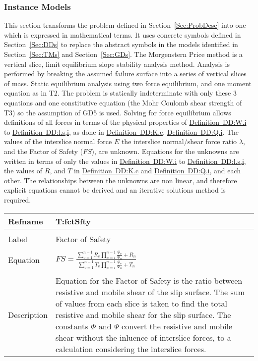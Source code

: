 \documentclass[12pt]{article}
\begin{document}
\subsubsection{Instance Models}
\label{Sec:IMs}
This section transforms the problem defined in Section~\ref{Sec:ProbDesc} into one which is expressed in mathematical terms. It uses concrete symbols defined in Section~\ref{Sec:DDs} to replace the abstract symbols in the models identified in Section~\ref{Sec:TMs} and Section~\ref{Sec:GDs}.
The Morgenstern Price method is a vertical slice, limit equilibrium slope stability analysis method. Analysis is performed by breaking the assumed failure surface into a series of vertical slices of mass. Static equilibrium analysis using two force equilibrium, and one moment equation as in T2. The problem is statically indeterminate with only these 3 equations and one constitutive equation (the Mohr Coulomb shear strength of T3) so the assumption of GD5 is used. Solving for force equilibrium allows definitions of all forces in terms of the physical properties of \hyperref[DD:W.i]{Definition~DD:W.i} to \hyperref[DD:l.s,i]{Definition~DD:l.s,i}, as done in \hyperref[DD:K.c]{Definition~DD:K.c}, \hyperref[DD:Q.i]{Definition~DD:Q.i}.
The values of the interslice normal force $E$ the interslice normal/shear force ratio $λ$, and the Factor of Safety ($FS$), are unknown. Equations for the unknowns are written in terms of only the values in \hyperref[DD:W.i]{Definition~DD:W.i} to \hyperref[DD:l.s,i]{Definition~DD:l.s,i}, the values of $R$, and $T$ in \hyperref[DD:K.c]{Definition~DD:K.c} and \hyperref[DD:Q.i]{Definition~DD:Q.i}, and each other. The relationships between the unknowns are non linear, and therefore explicit equations cannot be derived and an iterative solutions method is required.
~\newline
\noindent \begin{minipage}{\textwidth}
\begin{tabular}{p{} p{}}
\toprule \textbf{Refname} & \textbf{T:fctSfty}
\label{T:fctSfty}
\\ \midrule \\
Label & Factor of Safety
\\ \midrule \\
Equation & $FS=\frac{\displaystyle\sum_{v=1}^{n-1}{R_{v} \displaystyle\prod_{u=i}^{n-1}{\frac{Ψ_{u}}{Φ_{u}}}}+R_{n}}{\displaystyle\sum_{v=1}^{n-1}{T_{v} \displaystyle\prod_{u=i}^{n-1}{\frac{Ψ_{u}}{Φ_{u}}}}+T_{n}}$
\\ \midrule \\
Description & Equation for the Factor of Safety is the ratio between resistive and mobile shear of the slip surface. The sum of values from each slice is taken to find the total resistive and mobile shear for the slip surface. The constants $Φ$ and $Ψ$ convert the resistive and mobile shear without the inluence of interslice forces, to a calculation considering the interslice forces.
\\ \bottomrule \end{tabular}
\end{minipage}\\
\end{document}
